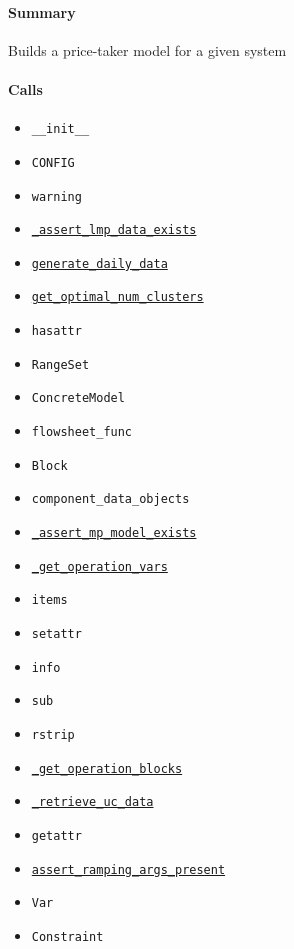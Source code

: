 \documentclass[11pt]{report}
\begin{document}
\paragraph{Summary} Builds a price-taker model for a given system
\paragraph{Calls}
\begin{itemize}[leftmargin=*]
  \item \texttt{\_\_init\_\_}
  \item \texttt{CONFIG}
  \item \texttt{warning}
  \item \hyperref[def:pricetaker-price_taker_model.py:PriceTakerModel._assert_lmp_data_exists:L213]{\texttt{\_assert\_lmp\_data\_exists}}
  \item \hyperref[def:pricetaker-clustering.py:generate_daily_data:L35]{\texttt{generate\_daily\_data}}
  \item \hyperref[def:pricetaker-clustering.py:get_optimal_num_clusters:L142]{\texttt{get\_optimal\_num\_clusters}}
  \item \texttt{hasattr}
  \item \texttt{RangeSet}
  \item \texttt{ConcreteModel}
  \item \texttt{flowsheet\_func}
  \item \texttt{Block}
  \item \texttt{component\_data\_objects}
  \item \hyperref[def:pricetaker-price_taker_model.py:PriceTakerModel._assert_mp_model_exists:L283]{\texttt{\_assert\_mp\_model\_exists}}
  \item \hyperref[def:pricetaker-price_taker_model.py:PriceTakerModel._get_operation_vars:L482]{\texttt{\_get\_operation\_vars}}
  \item \texttt{items}
  \item \texttt{setattr}
  \item \texttt{info}
  \item \texttt{sub}
  \item \texttt{rstrip}
  \item \hyperref[def:pricetaker-price_taker_model.py:PriceTakerModel._get_operation_blocks:L445]{\texttt{\_get\_operation\_blocks}}
  \item \hyperref[def:pricetaker-price_taker_model.py:PriceTakerModel._retrieve_uc_data:L628]{\texttt{\_retrieve\_uc\_data}}
  \item \texttt{getattr}
  \item \hyperref[def:pricetaker-unit_commitment.py:UnitCommitmentData.assert_ramping_args_present:L116]{\texttt{assert\_ramping\_args\_present}}
  \item \texttt{Var}
  \item \texttt{Constraint}
\end{itemize}
\end{document}
